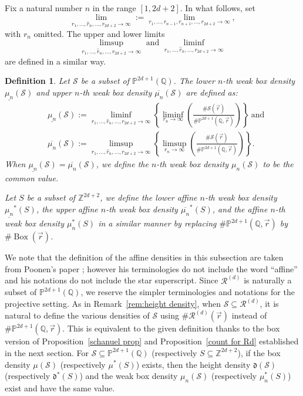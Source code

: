 \documentclass[12pt]{amsart}
\newtheorem{definition}[theorem]{Definition}
\newcommand{\Z}{\mathbb{Z}}
\newcommand{\Q}{\mathbb{Q}}
\newcommand{\cR}{\mathcal{R}}
\newcommand{\cS}{\mathcal{S}}
\newcommand{\op}[1]{\operatorname{#1}}
\numberwithin{equation}{section}
\begin{document}
Fix a natural number $n$ in the range $[1, 2d+2]$. In what follows, set 
\[\lim_{r_1, \dots, \hat{r}_{n}, \dots, r_{2d+2}\rightarrow \infty}:=\lim_{r_1, \dots, r_{n-1}, r_{n+1}, \dots, r_{2d+2}\rightarrow \infty},\] with $r_n$ omitted. The upper and lower limits 
\[\limsup_{r_1, \dots, \hat{r}_{n}, \dots, r_{2d+2}\rightarrow \infty}\text{ and } \liminf_{r_1, \dots, \hat{r}_{n}, \dots, r_{2d+2}\rightarrow \infty}\] are defined in a similar way.
\begin{definition}\label{def:weak box densities}
    Let $\mathcal{S}$ be a subset of $\mathbb{P}^{2d+1}(\Q)$. The 
    lower $n$-th weak box density $\underline{\mu_n}(\mathcal{S})$ and upper $n$-th weak box density $\overline{\mu_n}(\mathcal{S})$ are defined as:
    \[\begin{split} & \underline{\mu_n}(\cS):=\liminf_{r_1, \dots, \hat{r}_{n}, \dots, r_{2d+2}\rightarrow \infty}\left\{\liminf_{r_{n}\rightarrow \infty} \left(\frac{\# \cS(\vec{r})}{\# \mathbb{P}^{2d+1}(\Q,\vec{r})}\right)\right\}\ \text{and} \\
& \overline{\mu_n}(\cS):=\limsup_{r_1, \dots, \hat{r}_{n}, \dots, r_{2d+2}\rightarrow \infty}\left\{\limsup_{r_{n}\rightarrow \infty} \left(\frac{\# \cS(\vec{r})}{\# \mathbb{P}^{2d+1}(\Q,\vec{r})}\right)\right\}.
\end{split}\]
    When $\underline{\mu_n}(\mathcal{S})=\overline{\mu_n}(\mathcal{S})$,
    we define the $n$-th weak box density $\mu_n(\mathcal{S})$ to be the common value.

    Let $S$ be a subset of $\Z^{2d+2}$, we define the lower affine $n$-th weak box density $\underline{\mu_n}^*(S)$, the upper affine $n$-th weak box density $\overline{\mu_n}^*(S)$, and the affine $n$-th weak box density $\mu_n^*(S)$ in a similar manner by replacing
    $\#\mathbb{P}^{2d+1}(\Q,\vec{r})$ by $\# \op{Box}(\vec{r})$.
\end{definition}

We note that the definition of the affine densities in this subsection are taken from Poonen's paper \cite{Poonensquarefree}; however his terminologies do not include the word ``affine'' and his notations do not include the star superscript. Since $\cR^{(d)}$ is naturally a subset of $\mathbb{P}^{2d+1}(\Q)$, we reserve the simpler terminologies and notations for the projective setting.  As in Remark~\ref{rem:height density}, when $\mathcal{S}\subseteq \cR^{(d)}$, it is natural to define the various densities of $\mathcal{S}$ using $\# \cR^{(d)}(\vec{r})$ instead of
$\#\mathbb{P}^{2d+1}(\Q,\vec{r})$. This is equivalent to the given definition thanks to the box version of Proposition~\ref{schanuel prop}
and Proposition~\ref{count for Rd} established in the next section.
For $\mathcal{S}\subseteq\mathbb{P}^{2d+1}(\Q)$ (respectively
$S\subseteq \Z^{2d+2}$), if the box density $\mu(\mathcal{S})$
(respectively $\mu^*(S)$) exists, then the height density
$\mathfrak{d}(\mathcal{S})$ (respectively $\mathfrak{d}^*(S)$) and the
weak box density $\mu_n(\mathcal{S})$ (respectively $\mu_n^*(S)$) exist
and have the same value.
\end{document}

